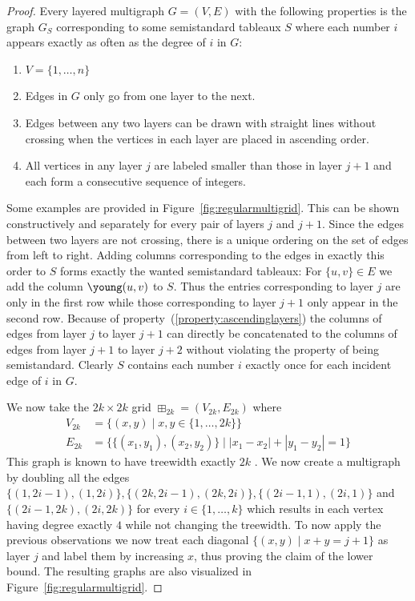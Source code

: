 \begin{proof}
    Every layered multigraph $G = (V, E)$ with the following properties is the graph $G_S$ corresponding to some semistandard tableaux $S$ where each number $i$ appears exactly as often as the degree of $i$ in $G$:
    \begin{enumerate}
        \item $V = \{1, \ldots, n\}$
        \item Edges in $G$ only go from one layer to the next.
        \item Edges between any two layers can be drawn with straight lines without crossing when the vertices in each layer are placed in ascending order.
        \item All vertices in any layer $j$ are labeled smaller than those in layer $j+1$ and each form a consecutive sequence of integers. \label{property:ascendinglayers}
    \end{enumerate}
    Some examples are provided in Figure~\ref{fig:regularmultigrid}.
    This can be shown constructively and separately for every pair of layers $j$ and $j+1$.
    Since the edges between two layers are not crossing, there is a unique ordering on the set of edges from left to right.
    Adding columns corresponding to the edges in exactly this order to $S$ forms exactly the wanted semistandard tableaux:
    For $\{u, v\} \in E$ we add the column {\scriptsize $\young(u,v)$} to $S$.
    Thus the entries corresponding to layer $j$ are only in the first row while those corresponding to layer $j+1$ only appear in the second row.
    Because of property~(\ref{property:ascendinglayers}) the columns of edges from layer $j$ to layer $j+1$ can directly be concatenated to the columns of edges from layer $j+1$ to layer $j+2$ without violating the property of being semistandard.
    Clearly $S$ contains each number $i$ exactly once for each incident edge of $i$ in $G$.

    We now take the $2k \times 2k$ grid $\boxplus_{2k} = (V_{2k}, E_{2k})$ where
    \begin{align*}
        V_{2k} &= \{(x,y) \mid x, y \in \{1, \ldots, 2k\}\}\\
        E_{2k} &= \{\{(x_1,y_1), (x_2,y_2)\} \mid |x_1 - x_2| + |y_1 - y_2| = 1\}
    \end{align*}
    This graph is known to have treewidth exactly $2k$ \cite{cygan2015parameterized}.
    We now create a multigraph by doubling all the edges $\{(1, 2i-1), (1, 2i)\}, \{(2k, 2i-1), (2k, 2i)\}, \{(2i-1, 1), (2i, 1)\}$ and $\{(2i-1, 2k), (2i, 2k)\}$ for every $i \in \{1, \ldots, k\}$ which results in each vertex having degree exactly $4$ while not changing the treewidth.
    To now apply the previous observations we now treat each diagonal $\{(x,y) \mid x+y = j+1\}$ as layer $j$ and label them by increasing $x$, thus proving the claim of the lower bound.
    The resulting graphs are also visualized in Figure~\ref{fig:regularmultigrid}.
\end{proof}

